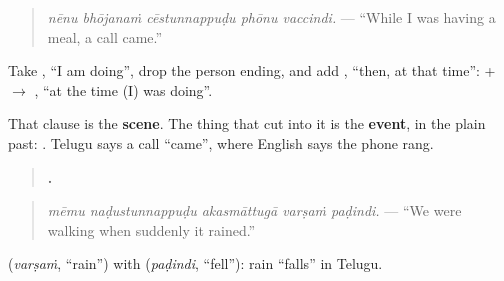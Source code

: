 \begin{quote}
\emph{nēnu bhōjanaṁ cēstunnappuḍu phōnu vaccindi.} — \textquotedblleft{}While I was having a meal, a call came.\textquotedblright{}
\end{quote}

Take \textbf{}, \textquotedblleft{}I am doing\textquotedblright{}, drop the person ending, and add \textbf{}, \textquotedblleft{}then, at that time\textquotedblright{}: \textbf{} + \textbf{} $\to$ \textbf{}, \textquotedblleft{}at the time (I) was doing\textquotedblright{}.

That clause is the \textbf{scene}. The thing that cut into it is the \textbf{event}, in the plain past: \textbf{}. Telugu says a call \textquotedblleft{}came\textquotedblright{}, where English says the phone rang.

\begin{quote}
\textbf{    .}
\end{quote}

\begin{quote}
\emph{mēmu naḍustunnappuḍu akasmāttugā varṣaṁ paḍindi.} — \textquotedblleft{}We were walking when suddenly it rained.\textquotedblright{}
\end{quote}

\textbf{} (\emph{varṣaṁ}, \textquotedblleft{}rain\textquotedblright{}) with \textbf{} (\emph{paḍindi}, \textquotedblleft{}fell\textquotedblright{}): rain \textquotedblleft{}falls\textquotedblright{} in Telugu.


